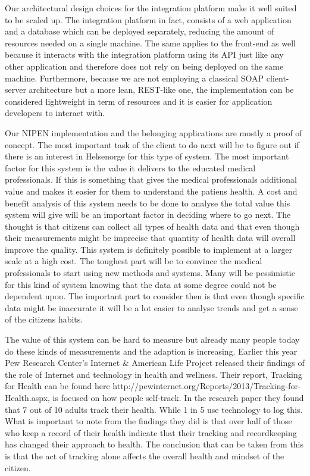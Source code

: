 Our architectural design choices for the integration platform make it well suited to be scaled up.
The integration platform in fact, consists of a web application and a database which can
be deployed separately, reducing the amount of resources needed on a single machine.
The same applies to the front-end as well because it interacts with the integration
platform using its API just like any other application and therefore does not rely on being deployed
on the same machine.
Furthermore, because we are not employing a classical SOAP client-server architecture but
a more lean, REST-like one, the implementation can be considered lightweight in term of resources
and it is easier for application developers to interact with.


\iffalse
Our NIPEN implementation and the belonging applications are mostly a proof of concept. 
The most important task of the client to do next will be to figure out if there is an interest in Helsenorge for this type of system.
The most important factor for this system is the value it delivers to the educated medical professionals. 
If this is something that gives the medical professionals additional value and makes it easier for them to understand the patiens health. 
A cost and benefit analysis of this system needs to be done to analyse the total value this system will give will be an important factor in deciding where to go next.
The thought is that citizens can collect all types of health data and that even though their measurements might be imprecise that quantity of health data will overall improve the quality.
This system is definitely possible to implement at a larger scale at a high cost.
The toughest part will be to convince the medical professionals to start using new methods and systems. 
Many will be pessimistic for this kind of system knowing that the data at some degree could not be dependent upon.
The important part to consider then is that even though specific data might be inaccurate it will be a lot easier to analyse trends and get a sense of the citizens habits. 

The value of this system can be hard to measure but already many people today do these kinds of measurements and the adaption is increasing. 
Earlier this year Pew Research Center’s Internet \& American Life Project released their findings of the role of Internet and technology in health and wellness. 
Their report, Tracking for Health can be found here http://pewinternet.org/Reports/2013/Tracking-for-Health.aspx, is focused on how people self-track.
In the research paper they found that 7 out of 10 adults track their health.
While 1 in 5 use technology to log this. 
What is important to note from the findings they did is that over half of those who keep a record of their health indicate that their tracking and recordkeeping has changed their approach to health.
The conclusion that can be taken from this is that the act of tracking alone affects the overall health and mindset of the citizen. 

